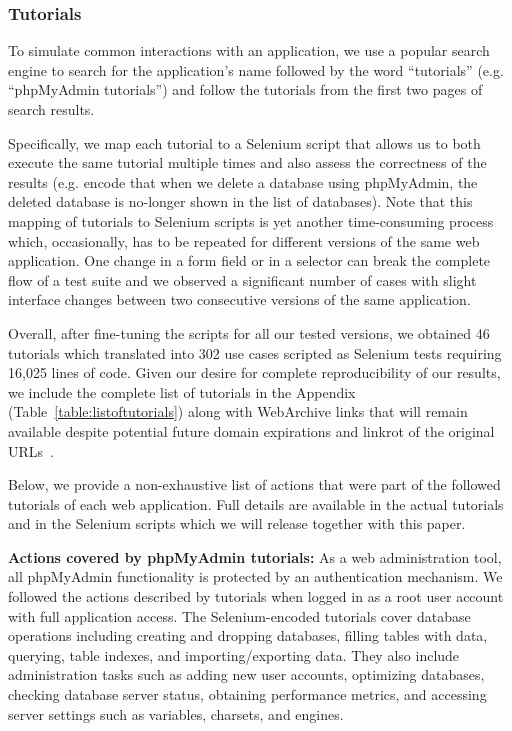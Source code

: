 \subsubsection{Tutorials}
\label{sec:tutorials}
To simulate common interactions with an application, we use a popular search
engine to search for the application's name followed by the word ``tutorials''
(e.g. ``phpMyAdmin tutorials'') and follow the tutorials from the first two
pages of search results.

Specifically, we map each tutorial to a Selenium script that allows us to
both execute the same tutorial multiple times and also assess the correctness
of the results (e.g. encode that when we delete a database using phpMyAdmin,
the deleted database is no-longer shown in the list of databases). Note that
this mapping of tutorials to Selenium scripts is yet another time-consuming
process which, occasionally, has to be repeated for different versions of
the same web application. One change in a form field or in a selector can
break the complete flow of a test suite and we observed a significant number
of cases with slight interface changes between two consecutive versions of
the same application.

Overall, after fine-tuning the scripts for all our tested versions, we obtained
46 tutorials which translated into 302 use cases scripted as Selenium tests
requiring 16,025 lines of code. Given our desire for complete reproducibility
of our results, we include the complete list of tutorials in the Appendix
(Table~\ref{table:listoftutorials}) along with WebArchive links that will
remain available despite potential future domain expirations and linkrot of
the original URLs~\cite{koehler2004longitudinal}.

Below, we provide a non-exhaustive list of actions that were part of the followed tutorials of each web application. Full details are available in the actual tutorials and in the Selenium scripts which we will release together with this paper.
\vspace{0.5ex}

\noindent \textbf{Actions covered by phpMyAdmin tutorials:} As a web administration tool, all phpMyAdmin functionality is protected by an authentication mechanism.
We followed the actions described by tutorials when logged in as a root user account with full application access. The Selenium-encoded tutorials cover database operations including creating and dropping databases, filling tables with data, querying, table indexes, and importing/exporting data.
They also include administration tasks such as adding new user accounts, optimizing databases, checking database server status, obtaining performance metrics, and accessing server settings such as variables, charsets, and engines.

